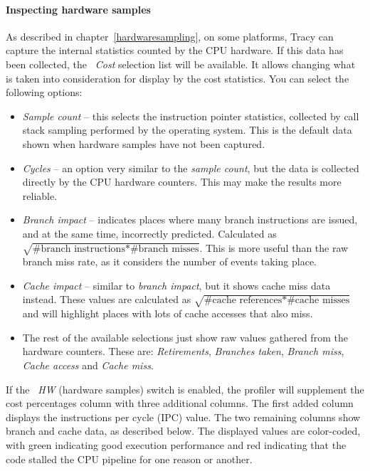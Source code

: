 \documentclass[hidelinks,titlepage,a4paper,twoside]{article}
\begin{document}
\paragraph{Inspecting hardware samples}

As described in chapter~\ref{hardwaresampling}, on some platforms, Tracy can capture the internal statistics counted by the CPU hardware. If this data has been collected, the \emph{\faHighlighter{}~Cost} selection list will be available. It allows changing what is taken into consideration for display by the cost statistics. You can select the following options:

\begin{itemize}
\item \emph{Sample count} -- this selects the instruction pointer statistics, collected by call stack sampling performed by the operating system. This is the default data shown when hardware samples have not been captured.
\item \emph{Cycles} -- an option very similar to the \emph{sample count}, but the data is collected directly by the CPU hardware counters. This may make the results more reliable.
\item \emph{Branch impact} -- indicates places where many branch instructions are issued, and at the same time, incorrectly predicted. Calculated as $\sqrt{\text{\#branch instructions}*\text{\#branch misses}}$. This is more useful than the raw branch miss rate, as it considers the number of events taking place.
\item \emph{Cache impact} -- similar to \emph{branch impact}, but it shows cache miss data instead. These values are calculated as $\sqrt{\text{\#cache references}*\text{\#cache misses}}$ and will highlight places with lots of cache accesses that also miss.
\item The rest of the available selections just show raw values gathered from the hardware counters. These are: \emph{Retirements}, \emph{Branches taken}, \emph{Branch miss}, \emph{Cache access} and \emph{Cache miss}.
\end{itemize}

If the \emph{\faHammer{}~HW} (hardware samples) switch is enabled, the profiler will supplement the cost percentages column with three additional columns. The first added column displays the instructions per cycle (IPC) value. The two remaining columns show branch and cache data, as described below. The displayed values are color-coded, with green indicating good execution performance and red indicating that the code stalled the CPU pipeline for one reason or another.
\end{document}
